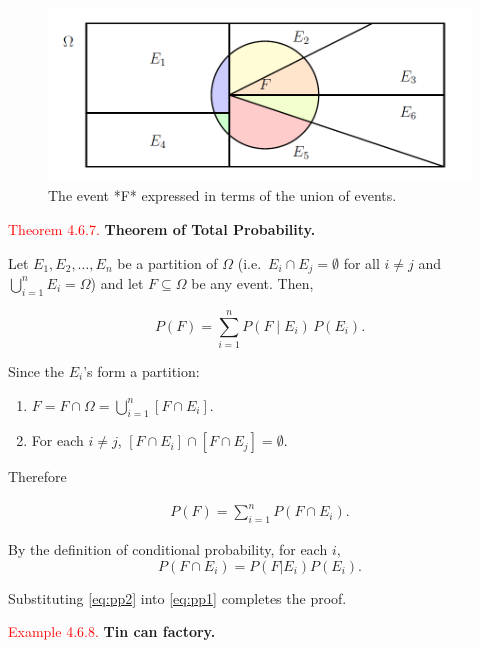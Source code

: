 \documentclass[
]{book}
\providecommand{\tightlist}{%
  \setlength{\itemsep}{0pt}\setlength{\parskip}{0pt}}
\begin{document}
\begin{figure}
\includegraphics[width=0.8\linewidth]{Images/partition2} \caption{The event *F* expressed in terms of the union of events.}\label{fig:partition2}
\end{figure}

\leavevmode{}%
\textcolor{red}{Theorem 4.6.7.}
{\textbf{Theorem of Total Probability.}}

Let \(E_1,E_2,\dots, E_n\) be a partition of \(\Omega\) (i.e.~\(E_i\cap E_j=\emptyset\) for all \(i\not=j\) and \(\bigcup\limits_{i=1}^n E_i=\Omega\)) and let \(F\subseteq \Omega\) be any event. Then,

\[P(F)=\sum_{i=1}^n P(F\mid E_i)\,P(E_i).\]

\leavevmode{}%
Since the \(E_i\)'s form a partition:

\begin{enumerate}
\def\labelenumi{\arabic{enumi}.}
\tightlist
\item
  \(F = F \cap \Omega = \bigcup_{i=1}^n [ F \cap E_i ]\).\\
\item
  For each \(i \neq j\), \([F \cap E_i] \cap [F \cap E_j] = \emptyset\).
\end{enumerate}

Therefore

\begin{eqnarray} 
P(F) = \sum_{i=1}^n P \left(F \cap E_i \right).  
\label{eq:pp1}  
\end{eqnarray}

By the definition of conditional probability, for each \(i\),\\

\begin{equation} 
P\left(F \cap E_i \right) = P(F|E_i) P(E_i).  
\label{eq:pp2}  
\end{equation}

Substituting \eqref{eq:pp2} into \eqref{eq:pp1} completes the proof.

\leavevmode{}%
\textcolor{red}{Example 4.6.8.}
{\textbf{Tin can factory.}}
\end{document}
